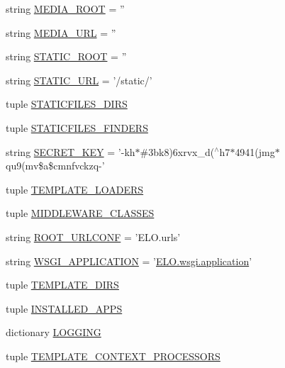 \begin{DoxyCompactItemize}
\item 
string \hyperlink{namespaceELO_1_1settings_a1f618eef9196cda0088f532a66ec0648}{M\-E\-D\-I\-A\-\_\-\-R\-O\-O\-T} = ''
\item 
string \hyperlink{namespaceELO_1_1settings_acd3e1c3559f7c87f5aad004b76458ddc}{M\-E\-D\-I\-A\-\_\-\-U\-R\-L} = ''
\item 
string \hyperlink{namespaceELO_1_1settings_ae5539527ada0171fc602c561493398f4}{S\-T\-A\-T\-I\-C\-\_\-\-R\-O\-O\-T} = ''
\item 
string \hyperlink{namespaceELO_1_1settings_a408323f388e22737eedf90471a3809a4}{S\-T\-A\-T\-I\-C\-\_\-\-U\-R\-L} = '/static/'
\item 
tuple \hyperlink{namespaceELO_1_1settings_aa2272e7a822b45c2101e4f5a958e22a6}{S\-T\-A\-T\-I\-C\-F\-I\-L\-E\-S\-\_\-\-D\-I\-R\-S}
\item 
tuple \hyperlink{namespaceELO_1_1settings_a3e4decd51fab7bd5bdbdb12aac13b70a}{S\-T\-A\-T\-I\-C\-F\-I\-L\-E\-S\-\_\-\-F\-I\-N\-D\-E\-R\-S}
\item 
string \hyperlink{namespaceELO_1_1settings_a13a984a190c7599ab7343322ab098d6d}{S\-E\-C\-R\-E\-T\-\_\-\-K\-E\-Y} = '-\/kh$\ast$\#3bk8)6xrvx\-\_\-d($^\wedge$h7$\ast$4941(jmg$\ast$qu9(mv\$a\$cmnfvckzq-\/'
\item 
tuple \hyperlink{namespaceELO_1_1settings_a9c876284f3865d5a15a73bedccfe3bb7}{T\-E\-M\-P\-L\-A\-T\-E\-\_\-\-L\-O\-A\-D\-E\-R\-S}
\item 
tuple \hyperlink{namespaceELO_1_1settings_a968380d6242dca6cc82acb1d806c703d}{M\-I\-D\-D\-L\-E\-W\-A\-R\-E\-\_\-\-C\-L\-A\-S\-S\-E\-S}
\item 
string \hyperlink{namespaceELO_1_1settings_a9c32eb39b369ab243858f8bd495e698b}{R\-O\-O\-T\-\_\-\-U\-R\-L\-C\-O\-N\-F} = 'E\-L\-O.\-urls'
\item 
string \hyperlink{namespaceELO_1_1settings_a065d3c6028b923c4918002832d2527be}{W\-S\-G\-I\-\_\-\-A\-P\-P\-L\-I\-C\-A\-T\-I\-O\-N} = '\hyperlink{namespaceELO_1_1wsgi_a8951c4ea2920440aeeb73c65ab517a5d}{E\-L\-O.\-wsgi.\-application}'
\item 
tuple \hyperlink{namespaceELO_1_1settings_a4e977a41e98923ee4c93b24d22b3d7e2}{T\-E\-M\-P\-L\-A\-T\-E\-\_\-\-D\-I\-R\-S}
\item 
tuple \hyperlink{namespaceELO_1_1settings_a1a4752075da59d93477195bcc3fc4765}{I\-N\-S\-T\-A\-L\-L\-E\-D\-\_\-\-A\-P\-P\-S}
\item 
dictionary \hyperlink{namespaceELO_1_1settings_addc421e02af1569796e2d33b2bc62ff5}{L\-O\-G\-G\-I\-N\-G}
\item 
tuple \hyperlink{namespaceELO_1_1settings_ad62b51880946e9380913c2f3811311bf}{T\-E\-M\-P\-L\-A\-T\-E\-\_\-\-C\-O\-N\-T\-E\-X\-T\-\_\-\-P\-R\-O\-C\-E\-S\-S\-O\-R\-S}
\end{DoxyCompactItemize}


